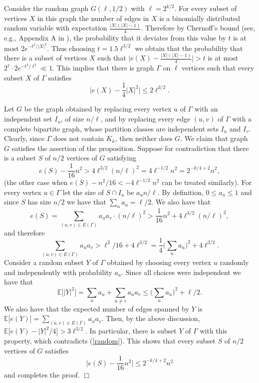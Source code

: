 \documentclass[11pt]{article}
\newenvironment{proof}
      {\medskip\noindent{\bf Proof.}\hspace{1mm}}
      {\hfill$\Box$\medskip}
\begin{document}
\begin{proof}
Consider the random graph $G(\ell,1/2)$ with $\ell=2^{ k /2}$. For
every subset of vertices $X$ in this graph the number of edges in
$X$ is a binomially distributed random variable with expectation
$\frac{|X|(|X|-1)}{4}$. Therefore by Chernoff's bound (see, e.g.,
Appendix A in \cite{AlSp}), the probability that it deviates from
this value by $t$ is at most $2e^{-t^2/|X|^2}$. Thus choosing
$t=1.5\ell^{3/2}$ we obtain that the probability that there is a
subset of vertices $X$ such that
$\big|e(X)-\frac{|X|(|X|-1)}{4}\big|>t$ is at most $2^\ell \cdot
2e^{-t^2/\ell^2} \ll 1$. This implies that there is graph $\Gamma$
on $\ell$ vertices such that every subset $X$ of $\Gamma$ satisfies
\begin{equation}
\label{random}
\Big|e(X)-\frac{1}{4}|X|^2\Big| \leq 2\ell^{3/2}.
\end{equation}

Let $G$ be the graph obtained by replacing every
vertex $u$ of $\Gamma$ with an independent set $I_u$, of size $n/\ell$,
and by replacing every edge $(u,v)$ of $\Gamma$ with a complete bipartite graph, whose
partition classes are independent sets $I_u$ and $I_v$.
Clearly, since $\Gamma$ does not contain $K_k$, then neither does $G$.
We claim that graph $G$ satisfies the assertion of the proposition.
Suppose for contradiction that there is a subset $S$ of  $n/2$ vertices of $G$ satisfying
$$e(S)-\frac{1}{16}n^2 >4\ell^{3/2}(n/\ell)^2=4\ell^{-1/2}n^2=2^{-k/4+2}n^2,$$
(the other case when $e(S)-n^2/16<-4\ell^{-1/2}n^2$ can be treated similarly).
For every vertex $u \in \Gamma$ let the size of $S \cap I_u$ be $a_un/\ell$.
By definition, $0 \leq a_u \leq 1$ and since $S$ has size $n/2$ we have that $\sum_u a_u=\ell/2$.
We also have that
$$e(S)=\sum_{(u,v)\in E(\Gamma)} a_u a_v \cdot (n/\ell)^2>\frac{1}{16}n^2+4\ell^{3/2}(n/\ell)^2,$$
and therefore
$$\sum_{(u,v)\in E(\Gamma)} a_u a_v >\ell^2/16+4\ell^{3/2}=\frac{1}{4}\Big(\sum_u a_u\Big)^2 +4\ell^{3/2}.$$
Consider a random  subset $Y$ of $\Gamma$ obtained by choosing every
vertex $u$ randomly and independently with probability $a_u$. Since
all choices were independent we have that
$$\mathbb{E}\big[|Y|^2\big]= \sum_u a_u +\sum_{u\not =v}a_ua_v \leq
\big(\sum_u a_u\big)^2+\ell/2.$$
We also have that the
expected number of edges spanned by $Y$ is
$\mathbb{E}\big[e(Y)\big]=\sum_{(u,v)\in E(\Gamma)} a_u a_v$. Then, by the above discussion,
$\mathbb{E}\big[e(Y)-|Y|^2/4\big] >3\ell^{3/2}$. In
particular, there is subset $Y$ of $\Gamma$ with this property,
 which contradicts
(\ref{random}). This shows that every subset  $S$ of  $n/2$
vertices of $G$ satisfies
$$\Big|e(S)-\frac{1}{16}n^2\Big| \leq 2^{-k/4+2}n^2$$
and completes the proof.
\end{proof}
\end{document}
